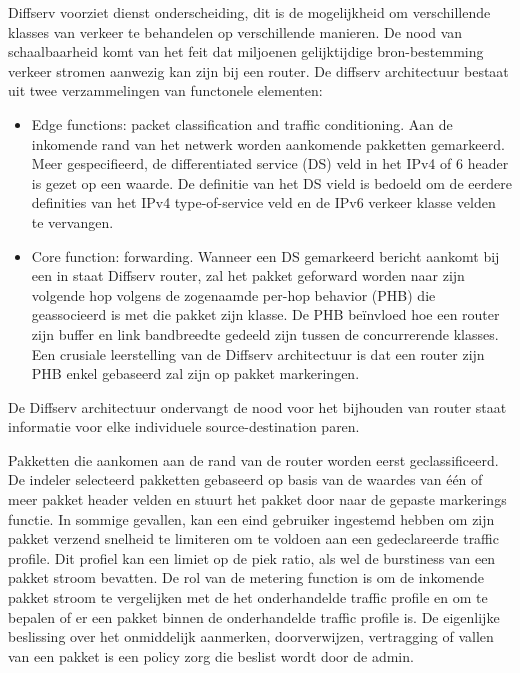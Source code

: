 \clearpage


Diffserv voorziet dienst onderscheiding, dit is de mogelijkheid om verschillende klasses van verkeer te behandelen op verschillende manieren. De nood van schaalbaarheid komt van het feit dat miljoenen gelijktijdige bron-bestemming verkeer stromen aanwezig kan zijn bij een router.
De diffserv architectuur bestaat uit twee verzammelingen van functonele elementen:
\begin{itemize}
 \item	Edge functions: packet classification and traffic conditioning. Aan de inkomende rand van het netwerk worden aankomende pakketten gemarkeerd. Meer gespecifieerd, de differentiated service (DS) veld in het IPv4 of 6 header is gezet op een waarde. De definitie van het DS vield is bedoeld om de eerdere definities van het IPv4 type-of-service veld en de IPv6 verkeer klasse velden te vervangen.
\item	Core function: forwarding. Wanneer een DS gemarkeerd bericht aankomt bij een in staat Diffserv router, zal het pakket geforward worden naar zijn volgende hop volgens de zogenaamde per-hop behavior (PHB) die geassocieerd is met die pakket zijn klasse. De PHB beïnvloed hoe een router zijn buffer en link bandbreedte gedeeld zijn tussen de concurrerende klasses. Een crusiale leerstelling van de Diffserv architectuur is dat een router zijn PHB enkel gebaseerd zal zijn op pakket markeringen.
\end{itemize}
De Diffserv architectuur ondervangt de nood voor het bijhouden van router staat informatie voor elke individuele source-destination paren.

Pakketten die aankomen aan de rand van de router worden eerst geclassificeerd. De indeler selecteerd pakketten gebaseerd op basis van de waardes van één of meer pakket header velden en stuurt het pakket door naar de gepaste markerings functie. In sommige gevallen, kan een eind gebruiker ingestemd hebben om zijn pakket verzend snelheid te limiteren om te voldoen aan een gedeclareerde traffic profile. Dit profiel kan een limiet op de piek ratio, als wel de burstiness van een pakket stroom bevatten. De rol van de metering function is om de inkomende pakket stroom te vergelijken met de het onderhandelde traffic profile en om te bepalen of er een pakket binnen de onderhandelde traffic profile is. De eigenlijke beslissing over het onmiddelijk aanmerken, doorverwijzen, vertragging of vallen van een pakket is een policy zorg die beslist wordt door de admin.

